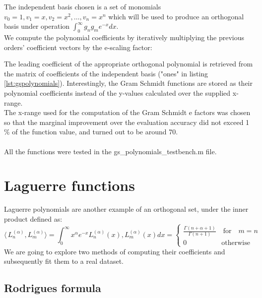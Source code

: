 \documentclass[a4paper]{article}
\numberwithin{equation}{section}
\begin{document}
The independent basis chosen is a set of monomials $v_0 = 1, v_1 = x, v_2 = x^2, \ldots, v_n=x^n$ which will be used to produce an orthogonal basis under operation $\int_{0}^{\infty} g_n g_m e^{-x} dx$.\\
We compute the polynomial coefficients by iteratively multiplying the previous orders' coefficient vectors by the e-scaling factor:



\noindent The leading coefficient of the appropriate orthogonal polynomial is retrieved from the matrix of coefficients of the independent basis ("ones" in listing \ref{lst:gspolynomials}). Interestingly, the Gram Schmidt functions are stored as their polynomial coefficients instead of the y-values calculated over the supplied x-range. \\
The x-range used for the computation of the Gram Schmidt e factors was chosen so that the marginal improvement over the evaluation accuracy did not exceed 1 \% of the function value, and turned out to be around 70. \\ \\
All the functions were tested in the gs\_polynomials\_testbench.m file.

\section{Laguerre functions}

Laguerre polynomials are another example of an orthogonal set, under the inner product defined as:
\begin{equation}
\langle\,L_n^{(\alpha)}, L_m^{(\alpha)}\rangle=\int_{0}^{\infty} x^{\alpha} e^{-x} L_n^{(\alpha)}(x), L_m^{(\alpha)}(x)dx = 
\begin{cases} 
      \frac{\Gamma(n+\alpha+1)}{\Gamma(n+1)} \quad \textrm{for} \quad m = n \\
      0 \quad \quad \quad \quad \quad \textrm{otherwise}
\end{cases}
\end{equation}
We are going to explore two methods of computing their coefficients and subsequently fit them to a real dataset.

\subsection{Rodrigues formula}
\end{document}
